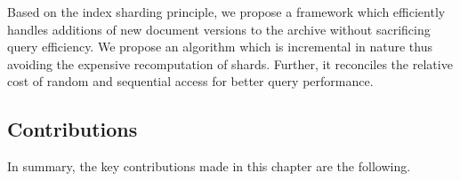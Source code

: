 Based on the index sharding principle, we propose a framework which efficiently handles additions of new document versions to the
archive without sacrificing query efficiency. We propose an algorithm which is incremental in nature thus avoiding the expensive recomputation of shards. Further, it reconciles the relative cost of random and sequential access for better query performance. 


\subsection{Contributions}
In summary, the key contributions made in this chapter are the following.

